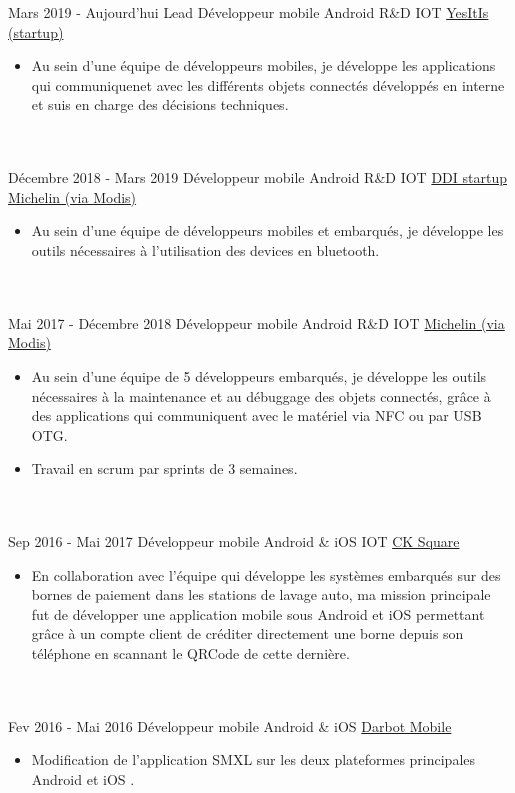 \documentclass[letterpaper]{twentysecondcv} %
\begin{document}
\begin{twenty} %
\twentyitem
    	{Mars 2019 -}
		{Aujourd'hui}
        {Lead Développeur mobile Android R\&D IOT}
        {\href{https://yesitis.fr/}{YesItIs (startup)}}
        {}
        {\begin{itemize}
        \item Au sein d'une équipe de développeurs mobiles, je développe les applications qui communiquenet avec les différents objets connectés développés en interne et suis en charge des décisions techniques.
        \end{itemize}}
        \\ \\
\twentyitem
    	{Décembre 2018 -}
		{Mars 2019}
        {Développeur mobile Android R\&D IOT}
        {\href{https://ddi.michelin.com/}{DDI startup Michelin (via Modis)}}
        {}
        {\begin{itemize}
        \item Au sein d'une équipe de développeurs mobiles et embarqués, je développe les outils nécessaires à l'utilisation des devices en bluetooth.
        \end{itemize}}
        \\ \\
\twentyitem
    	{Mai 2017 -}
		{Décembre 2018}
        {Développeur mobile Android R\&D IOT}
        {\href{http://www.michelin.fr/}{Michelin (via Modis)}}
        {}
        {\begin{itemize}
        \item Au sein d'une équipe de 5 développeurs embarqués, je développe les outils nécessaires à la maintenance et au débuggage des objets connectés, grâce à des applications qui communiquent avec le matériel via NFC ou par USB OTG.
        \item Travail en scrum par sprints de 3 semaines.
        \end{itemize}}
        \\ \\ 
	\twentyitem
    	{Sep 2016 -}
		{Mai 2017}
        {Développeur mobile Android \& iOS IOT}
        {\href{http://www.cksquare.fr/}{CK Square}}
        {}
        {
        {\begin{itemize}
        \item En collaboration avec l'équipe qui développe les systèmes embarqués sur des bornes de paiement dans les stations de lavage auto, ma mission principale fut de développer une application mobile sous Android et iOS permettant grâce à un compte client de créditer directement une borne depuis son téléphone en scannant le QRCode de cette dernière.
    \end{itemize}}
        }
    \\ \\ 
    \twentyitem
   		{Fev 2016 -}
		{Mai 2016}
        {Développeur mobile Android \& iOS}
        {\href{https://www.smxlapp.com/}{Darbot Mobile}}
        {}
        {
        {\begin{itemize}
        \item Modification de l'application SMXL sur les deux plateformes principales Android et iOS .
    \end{itemize}}
        }
   

\end{twenty}
\end{document}
